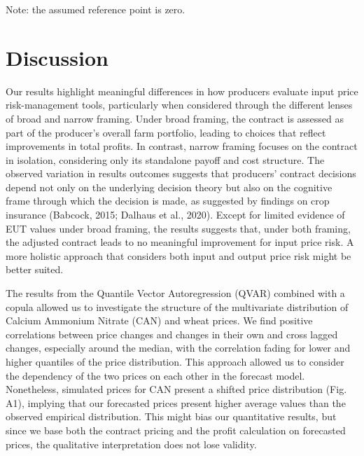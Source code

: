 \documentclass[
]{article}
\begin{document}
Note: the assumed reference point is zero.

\section{Discussion}\label{discussion}

Our results highlight meaningful differences in how producers evaluate
input price risk-management tools, particularly when considered through
the different lenses of broad and narrow framing. Under broad framing,
the contract is assessed as part of the producer's overall farm
portfolio, leading to choices that reflect improvements in total
profits. In contrast, narrow framing focuses on the contract in
isolation, considering only its standalone payoff and cost structure.
The observed variation in results outcomes suggests that producers'
contract decisions depend not only on the underlying decision theory but
also on the cognitive frame through which the decision is made, as
suggested by findings on crop insurance (Babcock, 2015; Dalhaus et al.,
2020). Except for limited evidence of EUT values under broad framing,
the results suggests that, under both framing, the adjusted contract
leads to no meaningful improvement for input price risk. A more holistic
approach that considers both input and output price risk might be better
suited.

The results from the Quantile Vector Autoregression (QVAR) combined with
a copula allowed us to investigate the structure of the multivariate
distribution of Calcium Ammonium Nitrate (CAN) and wheat prices. We find
positive correlations between price changes and changes in their own and
cross lagged changes, especially around the median, with the correlation
fading for lower and higher quantiles of the price distribution. This
approach allowed us to consider the dependency of the two prices on each
other in the forecast model. Nonetheless, simulated prices for CAN
present a shifted price distribution (Fig. A1), implying that our
forecasted prices present higher average values than the observed
empirical distribution. This might bias our quantitative results, but
since we base both the contract pricing and the profit calculation on
forecasted prices, the qualitative interpretation does not lose
validity.
\end{document}
